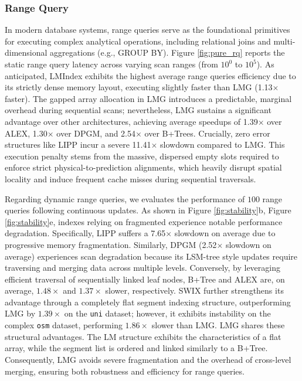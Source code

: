 \subsubsection{Range Query}
\label{sec:range_query}
In modern database systems, range queries serve as the foundational primitives for executing complex analytical operations, including relational joins and multi-dimensional aggregations (e.g., GROUP BY). Figure \ref{fig:pure_rq} reports the static range query latency across varying scan ranges (from $10^0$ to $10^5$). As anticipated, LMIndex exhibits the highest average range queries efficiency due to its strictly dense memory layout, executing slightly faster than LMG (1.13$\times$ faster). The gapped array allocation in LMG introduces a predictable, marginal overhead during sequential scans; nevertheless, LMG sustains a significant advantage over other architectures, achieving average speedups of 1.39$\times$ over ALEX, 1.30$\times$ over DPGM, and 2.54$\times$ over B+Trees. Crucially, zero error structures like LIPP incur a severe 11.41$\times$ slowdown compared to LMG. This execution penalty stems from the massive, dispersed empty slots required to enforce strict physical-to-prediction alignments, which heavily disrupt spatial locality and induce frequent cache misses during sequential traversals.

Regarding dynamic range queries, we evaluates the performance of $100$ range queries following continuous updates. As shown in Figure \ref{fig:stability}b, Figure \ref{fig:stability}e, indexes relying on fragmented experience notable performance degradation. Specifically, LIPP suffers a 7.65$\times$ slowdown on average due to progressive memory fragmentation. Similarly, DPGM (2.52$\times$ slowdown on average) experiences scan degradation because its LSM-tree style updates require traversing and merging data across multiple levels. Conversely, by leveraging efficient traversal of sequentially linked leaf nodes, B+Tree and ALEX are, on average, $1.48\times$ and $1.37\times$ slower, respectively. SWIX further strengthens its advantage through a completely flat segment indexing structure, outperforming LMG by $1.39\times$ on the \texttt{uni} dataset; however, it exhibits instability on the complex \texttt{osm} dataset, performing $1.86\times$ slower than LMG. LMG shares these structural advantages. The LM structure exhibits the characteristics of a flat array, while the segment list is ordered and linked similarly to a B+Tree. Consequently, LMG avoids severe fragmentation and the overhead of cross-level merging, ensuring both robustness and efficiency for range queries.

